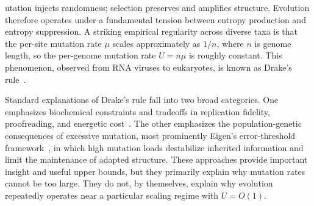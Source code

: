 \documentclass[9pt,twocolumn,oneside]{pnas-new}
\title{\TITLE}
\author[a]{Ishanu Chattopadhyay\orcidlink{0000-0001-8339-8162}}
\affil[a]{University of Kentucky}
\begin{document}
  

\maketitle
\thispagestyle{firststyle}





utation injects randomness; selection preserves and amplifies structure. Evolution therefore operates under a fundamental tension between entropy production and entropy suppression. A striking empirical regularity across diverse taxa is that the per-site mutation rate $\mu$ scales approximately as $1/n$, where $n$ is genome length, so the per-genome mutation rate $U=n\mu$ is roughly constant. This phenomenon, observed from RNA viruses to eukaryotes, is known as Drake’s rule~\cite{Drake1991,Lynch2010,SniegowskiRaynes2013,Hershberg2015}.

Standard explanations of Drake’s rule fall into two broad categories. One emphasizes biochemical constraints and tradeoffs in replication fidelity, proofreading, and energetic cost~\cite{Lynch2010}. The other emphasizes the population-genetic consequences of excessive mutation, most prominently Eigen’s error-threshold framework~\cite{Eigen1971}, in which high mutation loads destabilize inherited information and limit the maintenance of adapted structure. These approaches provide important insight and useful upper bounds, but they primarily explain why mutation rates cannot be too large. They do not, by themselves, explain why evolution repeatedly operates near a particular scaling regime with $U=O(1)$.
\end{document}
